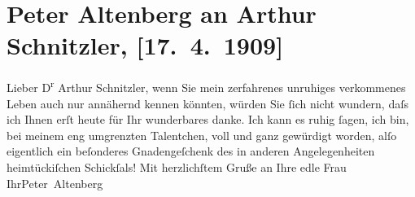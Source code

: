 

         
         \renewcommand{\erwaehntePersonen}{Personen: Olga Schnitzler}
         \renewcommand{\erwaehnteOrte}{Orte: Wien}
         \renewcommand{\erwaehnteWerke}{}
               \section[Peter Altenberg an Arthur Schnitzler, {[}17. 4. 1909{]}]{ Peter Altenberg an Arthur Schnitzler, {[}17. 4. 1909{]}}\nopagebreak{}\rehead{ }\begin{ledgroupsized}[t]{13cm}\normalsize\beginnumbering \toendnotes[C]{\smallbreak\pagebreak[2]} 
\toendnotes[C]{\smallbreak}\pstart{}{\pb}Lieber \textsc{D}\textsuperscript{r} Arthur Schnitzler,\pend\pstart
           wenn Sie mein zerfahrenes unruhiges verkommenes Leben auch nur annähernd kennen
               könnten, würden Sie ſich nicht wundern, daſs ich Ihnen erſt heute für Ihr wunderbares
                  \label{K_L01839_1v}\label{K_L01839_1h} danke.\pend
           \pstart
           Ich kann es ruhig ſagen, ich bin, bei meinem eng umgrenzten Talentchen, voll und ganz
               gewürdigt worden, alſo eigentlich ein beſonderes Gnadengeſchenk des in anderen
               Angelegenheiten heimtückiſchen Schickſals!\pend
           \pstart
           Mit herzlichſtem Gruße an Ihre edle Frau\pend
           \pstart Ihr\hspace*{1.5em}\spacefill\mbox{Peter Altenberg}\pend{}
         
         \endnumbering{}\end{ledgroupsized}  \newcommand{\dateiname}{L01839}\newcommand{\titel}{Peter Altenberg an Arthur Schnitzler, [17. 4. 1909]}\newcommand{\editorInnen}{Martin Anton Müller und Gerd-Hermann Susen}
      